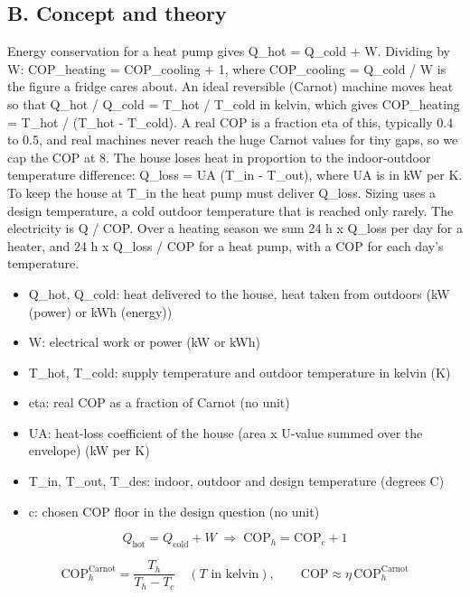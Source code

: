 \documentclass[11pt,a4paper]{article}
\begin{document}
\subsection*{B. Concept and theory}
Energy conservation for a heat pump gives Q\_hot = Q\_cold + W. Dividing by W: COP\_heating = COP\_cooling + 1, where COP\_cooling = Q\_cold / W is the figure a fridge cares about. An ideal reversible (Carnot) machine moves heat so that Q\_hot / Q\_cold = T\_hot / T\_cold in kelvin, which gives COP\_heating = T\_hot / (T\_hot - T\_cold). A real COP is a fraction eta of this, typically 0.4 to 0.5, and real machines never reach the huge Carnot values for tiny gaps, so we cap the COP at 8. The house loses heat in proportion to the indoor-outdoor temperature difference: Q\_loss = UA (T\_in - T\_out), where UA is in kW per K. To keep the house at T\_in the heat pump must deliver Q\_loss. Sizing uses a design temperature, a cold outdoor temperature that is reached only rarely. The electricity is Q / COP. Over a heating season we sum 24 h x Q\_loss per day for a heater, and 24 h x Q\_loss / COP for a heat pump, with a COP for each day's temperature.

\begin{itemize}[nosep]
\item Q\_hot, Q\_cold: heat delivered to the house, heat taken from outdoors (kW (power) or kWh (energy))
\item W: electrical work or power (kW or kWh)
\item T\_hot, T\_cold: supply temperature and outdoor temperature in kelvin (K)
\item eta: real COP as a fraction of Carnot (no unit)
\item UA: heat-loss coefficient of the house (area x U-value summed over the envelope) (kW per K)
\item T\_in, T\_out, T\_des: indoor, outdoor and design temperature (degrees C)
\item c: chosen COP floor in the design question (no unit)
\end{itemize}

\begin{equation*}
Q_{\text{hot}}=Q_{\text{cold}}+W\;\Rightarrow\;\mathrm{COP}_h=\mathrm{COP}_c+1
\end{equation*}

\begin{equation*}
\mathrm{COP}_h^{\text{Carnot}}=\frac{T_h}{T_h-T_c}\quad(T\text{ in kelvin}),\qquad \mathrm{COP}\approx\eta\,\mathrm{COP}_h^{\text{Carnot}}
\end{equation*}
\end{document}
